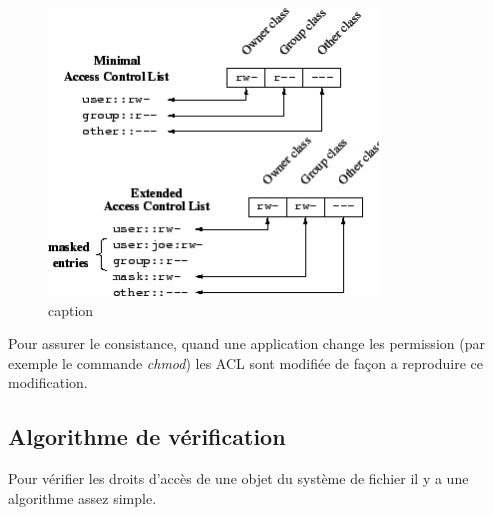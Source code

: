 \begin{figure}[htbp]
	\centering
		\includegraphics[height=3in]{img/acl-mapping.jpg}
	\caption{caption}
	\label{fig:img_acl-mapping}
\end{figure}


Pour assurer le consistance, quand une application change les permission (par exemple le commande \emph{chmod}) les ACL sont modifiée de façon a reproduire ce modification. 



%
% 
% 
% 
% 
% 
% 

\subsection*{Algorithme de vérification}

Pour vérifier les droits d'accès de une objet du système de fichier il y a une algorithme assez simple. 

